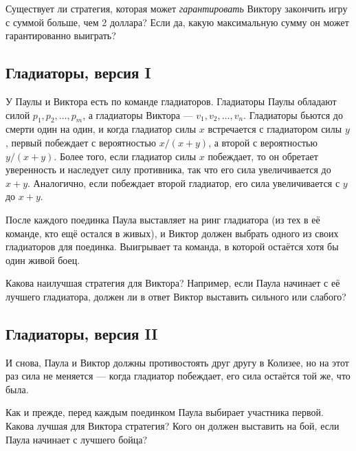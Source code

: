 \medskip

Существует ли стратегия, которая может \emph{гарантировать} Виктору закончить игру с суммой больше, чем 2 доллара?
Если да, какую максимальную сумму он может гарантированно выиграть? 

\subsection*{Гладиаторы, версия I} %

У Паулы и Виктора есть по команде гладиаторов.
Гладиаторы Паулы обладают силой $p_1, p_2,\dots, p_m$, а гладиаторы Виктора --- $v_1, v_2,\dots, v_n$.
Гладиаторы бьются до смерти один на один, и когда гладиатор силы $x$ встречается с гладиатором силы $y$, первый побеждает с вероятностью $x/(x+y)$, а второй с вероятностью $y/(x+y)$.
Более того, если гладиатор силы $x$ побеждает, то он обретает уверенность и наследует силу противника, так что его сила увеличивается до $x+y$.
Аналогично, если побеждает второй гладиатор, его сила увеличивается с $y$ до $x+y$.

После каждого поединка Паула выставляет на ринг гладиатора (из тех в её команде, кто ещё остался в живых), и Виктор должен выбрать одного из своих гладиаторов для поединка.
Выигрывает та команда, в которой остаётся хотя бы один живой боец.

\medskip

Какова наилучшая стратегия для Виктора?
Например, если Паула начинает с её лучшего гладиатора, должен ли в ответ Виктор выставить сильного или слабого?

\subsection*{Гладиаторы, версия II} %

И снова, Паула и Виктор должны противостоять друг другу в Колизее, но на этот раз сила не меняется --- когда гладиатор побеждает, его сила остаётся той же, что была.

\medskip

Как и прежде, перед каждым поединком Паула выбирает участника первой.
Какова лучшая для Виктора стратегия? Кого он должен выставить на бой, если Паула начинает с лучшего бойца?
